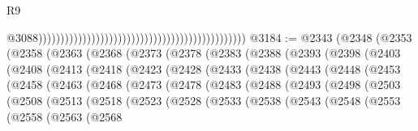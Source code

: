 \begin{lexlean}{R9}
\begin{coremodule}
                                                                                                  @3088)))))))))))))))))))))))))))))))))))))))))))))))
@3184 := @2343
    (@2348
      (@2353
        (@2358
          (@2363
            (@2368
              (@2373
                (@2378
                  (@2383
                    (@2388
                      (@2393
                        (@2398
                          (@2403
                            (@2408
                              (@2413
                                (@2418
                                  (@2423
                                    (@2428
                                      (@2433
                                        (@2438
                                          (@2443
                                            (@2448
                                              (@2453
                                                (@2458
                                                  (@2463
                                                    (@2468
                                                      (@2473
                                                        (@2478
                                                          (@2483
                                                            (@2488
                                                              (@2493
                                                                (@2498
                                                                  (@2503
                                                                    (@2508
                                                                      (@2513
                                                                        (@2518
                                                                          (@2523
                                                                            (@2528
                                                                              (@2533
                                                                                (@2538
                                                                                  (@2543
                                                                                    (@2548
                                                                                      (@2553
                                                                                        (@2558
                                                                                          (@2563
                                                                                            (@2568

\end{coremodule}
\end{lexlean}
